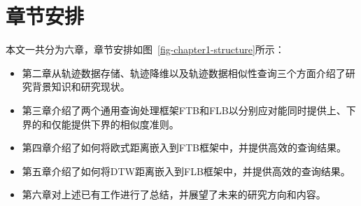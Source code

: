 \section{章节安排}
本文一共分为六章，章节安排如图~\ref{fig-chapter1-structure}所示：
\begin{itemize}
	\item 第二章从轨迹数据存储、轨迹降维以及轨迹数据相似性查询三个方面介绍了研究背景知识和研究现状。
	\item 第三章介绍了两个通用查询处理框架FTB和FLB以分别应对能同时提供上、下界的和仅能提供下界的相似度准则。
	\item 第四章介绍了如何将欧式距离嵌入到FTB框架中，并提供高效的查询结果。
	\item 第五章介绍了如何将DTW距离嵌入到FLB框架中，并提供高效的查询结果。
	\item 第六章对上述已有工作进行了总结，并展望了未来的研究方向和内容。
\end{itemize}

\clearpage
\phantom{s}
\clearpage